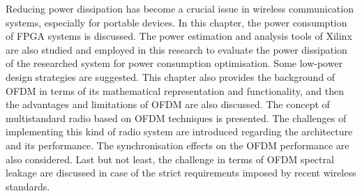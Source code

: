 Reducing power dissipation has become a crucial issue in wireless communication systems, especially for portable devices.
In this chapter, the power consumption of FPGA systems is discussed.
The power estimation and analysis tools of Xilinx are also studied and employed in this research to evaluate the power dissipation of the researched system for power consumption optimisation.
Some low-power design strategies are suggested.
This chapter also provides the background of OFDM in terms of its mathematical representation and functionality, and then the advantages and limitations of OFDM are also discussed.
The concept of multistandard radio based on OFDM techniques is presented. The challenges of implementing this kind of radio system are introduced regarding the architecture and its performance.
The synchronisation effects on the OFDM performance are also considered.
Last but not least, the challenge in terms of OFDM spectral leakage are discussed in case of the strict requirements imposed by recent wireless standards.
